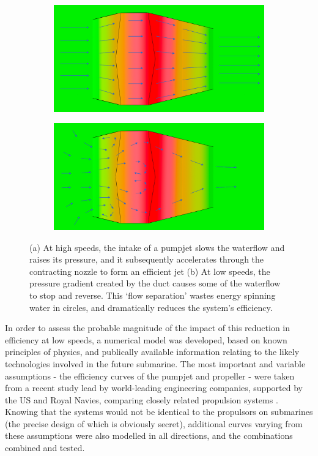 \documentclass{article}\usepackage[]{graphicx}\usepackage[]{color}
\begin{document}
\begin{figure}[h]

\begin{subfigure}{0.5\textwidth}
\includegraphics[width=0.9\linewidth]{HiFlowSmall.png}
\caption{}
\end{subfigure}
\begin{subfigure}{0.5\textwidth}
\includegraphics[width=0.9\linewidth]{LoFlowSmall.png}
\caption{}
\end{subfigure}

\caption{(a) At high speeds, the intake of a pumpjet slows the waterflow and raises its pressure, and it subsequently accelerates through the contracting nozzle to form an efficient jet (b) At low speeds, the pressure gradient created by the duct causes some of the waterflow to stop and reverse.  This `flow separation' wastes energy spinning water in circles, and dramatically reduces the system's efficiency.}
\label{fig:HiLoSmall.png}
\end{figure}

In order to assess the probable magnitude of the impact of this reduction in efficiency at low speeds, a numerical model was developed, based on known principles of physics, and publically available information relating to the likely technologies involved in the future submarine.  The most important and variable assumptions - the efficiency curves of the pumpjet and propeller - were taken from a recent study lead by world-leading engineering companies, supported by the US and Royal Navies, comparing closely related propulsion systems  \parencite{giles2010}.  Knowing that the systems would not be identical to the propulsors on submarines (the precise design of which is obviously secret), additional curves varying from these assumptions were also modelled in all directions, and the combinations combined and tested.
\end{document}
